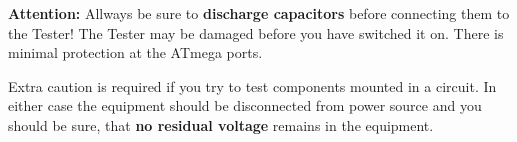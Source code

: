 \vspace{1cm}
\textbf{\Large {Attention:}} Allways be sure to \textbf {discharge capacitors} before connecting them to the Tester!
The Tester may be damaged before you have switched it on. There is minimal protection at the ATmega ports.

Extra caution is required if you try to test components mounted in a circuit.
In either case the equipment should be disconnected from power source and you should be sure,
that \textbf {no residual voltage} remains in the equipment.

